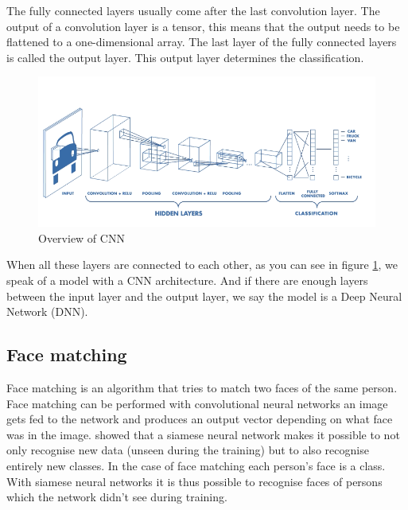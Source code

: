 The fully connected layers usually come after the last convolution layer. The output of a convolution layer is a tensor, this means that the output needs to be flattened to a one-dimensional array. The last layer of the fully connected layers is called the output layer. This output layer determines the classification.

\begin{figure}[H]
  \includegraphics[width=\linewidth]{fig/cnn.png}
  \caption{Overview of CNN}
  \label{fig:cnn}
\end{figure}

When all these layers are connected to each other, as you can see in figure \ref{fig:cnn}, we speak of a model with a CNN architecture. And if there are enough layers between the input layer and the output layer, we say the model is a Deep Neural Network (DNN).

\subsection{Face matching}
Face matching is an algorithm that tries to match two faces of the same person. Face matching can be performed with convolutional neural networks an image gets fed to the network and produces an output vector depending on what face was in the image. \cite{koch2015siamese} showed that a siamese neural network makes it possible to not only recognise new data (unseen during the training) but to also recognise entirely new classes. In the case of face matching each person's face is a class. With siamese neural networks it is thus possible to recognise faces of persons which the network didn't see during training.

